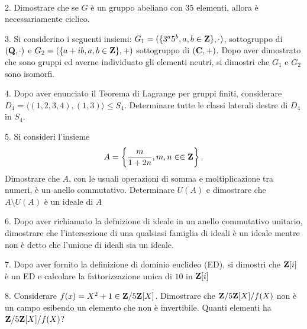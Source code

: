 \ \dotfill\ \bigskip\bigskip\bigskip


\vfil\eject

\item{2.} Dimostrare che se $G$ \`e un gruppo abeliano con $35$ elementi, allora \`e necessariamente
ciclico.\vv

\item{3.} Si considerino i seguenti insiemi:
$G_1 =(\{ 3^a 5^b, a, b\in{\bf Z}\},\cdot)$, sottogruppo di $({\bf Q},\cdot)$
e
$G_2 =(\{a + ib, a, b \in{\bf Z}\}, +)$ sottogruppo di $({\bf C}, +)$. 
Dopo aver dimostrato che sono gruppi ed averne individuato gli elementi neutri, si dimostri 
che $G_1$ e $G_2$ sono isomorfi.\ve\vs

\item{4.} Dopo aver enunciato il
Teorema di Lagrange per gruppi finiti, considerare 
$D_4 = \langle(1, 2, 3, 4), (1, 3)\rangle \le S_4$. Determinare tutte le classi laterali destre di $D_4$ in $S_4$.\vv

\item{5.} Si consideri l'insieme
$$A = \left\{{m\over 1 + 2n}, m, n \in\in{\bf Z}\right\}.$$
Dimostrare che $A$, con le usuali operazioni di somma e moltiplicazione tra numeri, \`e un anello commutativo.
Determinare $U(A)$ e dimostrare che $A\setminus U(A)$ \`e un ideale di $A$\ve\vs

\item{6.} Dopo aver richiamato la defnizione di ideale in un anello commutativo unitario, dimostrare che l'intersezione di una qualsiasi
famiglia di ideali \`e un ideale mentre non \`e detto che l'unione di ideali sia un ideale.\vv

\item{7.} Dopo aver fornito la definizione di dominio euclideo (ED), si dimostri che
${\bf Z}[i]$ \`e un ED e calcolare la fattorizzazione unica di $10$ in ${\bf Z}[i]$ 
\vv

\item{8.} Considerare $f(x)=X^2+1\in{\bf Z}/5{\bf Z}[X]$. Dimostrare che ${\bf Z}/{5\bf Z}[X]/f(X)$
non \`e un campo esibendo un elemento che non \`e invertibile. Quanti elementi ha ${\bf Z}/{5\bf Z}[X]/f(X)$?
\ve \vs
 \bye


\ \vst
